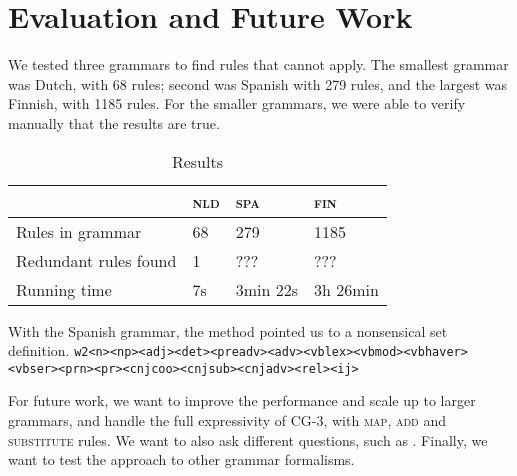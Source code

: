 \section{Evaluation and Future Work}
\label{sec:eval}

We tested three grammars to find rules that cannot apply. The smallest grammar was Dutch, with 68 rules; second was Spanish with 279 rules, and the largest was Finnish, with 1185 rules.
For the smaller grammars, we were able to verify manually that the results are true.

\begin{table}[]
\centering
\begin{tabular}{|l|l|l|l|}
\hline
                      & \textsc{nld}  & \textsc{spa}  & \textsc{fin}  \\ \hline
Rules in grammar      & 68              & 279               & 1185              \\ \hline
Redundant rules found & 1               & ???               & ???    \\ \hline
Running time          & 7s              & 3min 22s          & 3h 26min    \\ \hline
\end{tabular}
\caption{Results}
\label{table:res}
\end{table}

With the Spanish grammar, the method pointed us to a nonsensical set definition.
\texttt{w2<n><np><adj><det><preadv><adv><vblex><vbmod><vbhaver><vbser><prn><pr><cnjcoo><cnjsub><cnjadv><rel><ij>}

For future work, we want to improve the performance and scale up to larger grammars, and handle the full expressivity of CG-3, with \textsc{map}, \textsc{add} and \textsc{substitute} rules.
We want to also ask different questions, such as .
Finally, we want to test the approach to other grammar formalisms.




